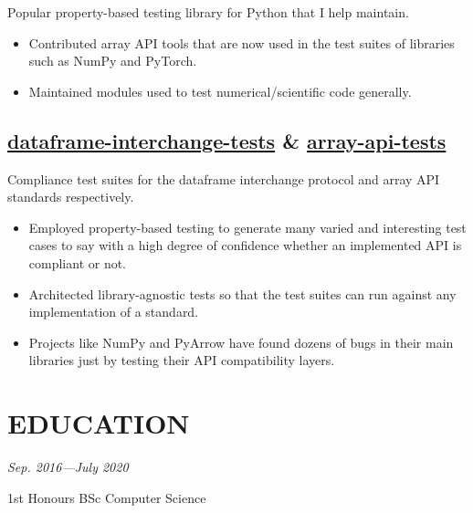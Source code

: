 \documentclass[11pt]{article}
\newcommand{\datedsubsection}[2]{{\large\subsectionfont{#1}} \hfill {\scriptsize\textit{#2}}}
\newcommand{\listhighlights}[1]{
	\begin{itemize}[topsep=2pt, partopsep=0pt, itemsep=2pt, parsep=0pt, leftmargin=12pt]
		#1
	\end{itemize}
}
\begin{document}
Popular property-based testing library for Python that I help maintain.

\listhighlights{
	\item Contributed array API tools that are now used in the test suites of libraries such as NumPy and PyTorch.
	\item Maintained modules used to test numerical/scientific code generally.
}

\subsection*{\href{https://github.com/data-apis/dataframe-interchange-tests/}{dataframe-interchange-tests} \& \href{https://github.com/data-apis/array-api-tests/}{array-api-tests}}

Compliance test suites for the dataframe interchange protocol and array API standards respectively.

\listhighlights{
	\item Employed property-based testing to generate many varied and interesting test cases to say with a high degree of confidence whether an implemented API is compliant or not.
	\item Architected library-agnostic tests so that the test suites can run against any implementation of a standard.
	\item Projects like NumPy and PyArrow have found dozens of bugs in their main libraries just by testing their API compatibility layers.
}

\iffalse
\section*{PUBLICATIONS}

\href{https://proceedings.scipy.org/articles/gerudo-f2bc6f59-001}{Consortium for Data API Standards, `Python Array API Standard: Toward Array Interoperability in the Scientific Python Ecosystem', 2023}
\fi

\section*{EDUCATION}

\datedsubsection{Aston University}{Sep. 2016—July 2020}

1st Honours BSc Computer Science
\end{document}
